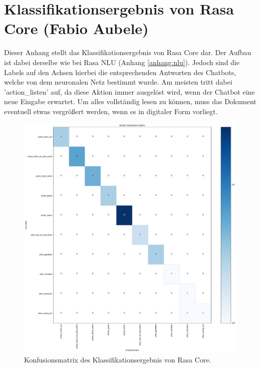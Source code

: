\section{Klassifikationsergebnis von Rasa Core (Fabio Aubele)}\label{anhang:core}
Dieser Anhang stellt das Klassifikationsergebnis von Rasa Core dar. Der Aufbau ist dabei derselbe wie bei Rasa NLU (Anhang \ref{anhang:nlu}). Jedoch sind die Labels auf den Achsen hierbei die entsprechenden Antworten des Chatbots, welche von dem neuronalen Netz bestimmt wurde. Am meisten tritt dabei 'action\_listen' auf, da diese Aktion immer ausgelöst wird, wenn der Chatbot eine neue Eingabe erwartet. Um alles vollständig lesen zu können, muss das Dokument eventuell etwas vergrößert werden, wenn es in digitaler Form vorliegt.
\begin{figure}[htbp]
	\centerline{\includegraphics[width=1\linewidth]{figures/story_confmat.pdf}}
	\caption{Konfusionsmatrix des Klassifikationsergebnis von Rasa Core.}
	\label{confcore}
\end{figure}